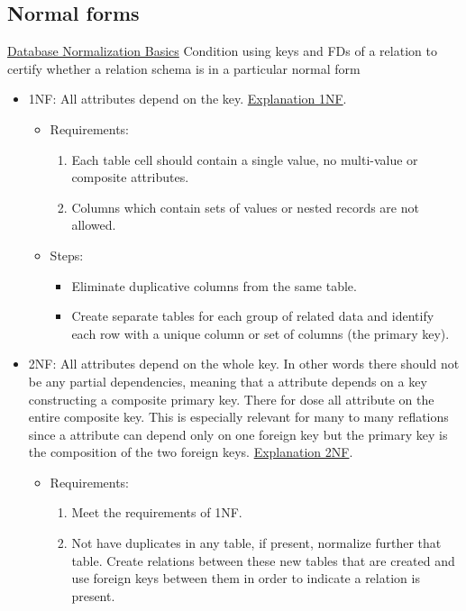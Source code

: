 \subsection{Normal forms}
\href{https://www.lifewire.com/database-normalization-basics-1019735}{Database Normalization Basics}
Condition using keys and FDs of a relation to
certify whether a relation schema is in a particular
normal form
\begin{itemize}
    \item 1NF: All attributes depend on the key. \href{https://www.youtube.com/watch?v=mUtAPbb1ECM}{Explanation 1NF}. 
    \begin{itemize}
        \item Requirements:
        \begin{enumerate}
            \item Each table cell should contain a single value, no multi-value or composite attributes.
            \item Columns which contain sets of values or nested records are not allowed.
        \end{enumerate}
        \item Steps:
        \begin{itemize}
            \item Eliminate duplicative columns from the same table.
            \item Create separate tables for each group of related data and identify each row with a unique column or set of columns (the primary key).
        \end{itemize}
    \end{itemize}
    \item 2NF: All attributes depend on the whole key. In other words
    there should not be any partial dependencies, meaning that a attribute
    depends on a key constructing a composite primary key. There for dose all 
    attribute on the entire composite key. This is especially relevant for 
    many to many reflations since a attribute can depend only on one foreign key 
    but the primary key is the composition of the two foreign keys.
    \href{https://www.youtube.com/watch?v=R7UblSu4744}{Explanation 2NF}.
    \begin{itemize}
        \item Requirements:
        \begin{enumerate}
            \item Meet the requirements of 1NF.
            \item Not have duplicates in any table, if present, normalize further that table. Create relations between these new tables that are created and use foreign keys between them in order to indicate a relation is present. 

\end{enumerate}
\end{itemize}
\end{itemize}
